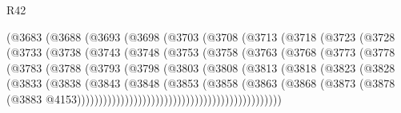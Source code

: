 \begin{lexlean}{R42}
\begin{coremodule}
{                (@3683
                  (@3688
                    (@3693
                      (@3698
                        (@3703
                          (@3708
                            (@3713
                              (@3718
                                (@3723
                                  (@3728
                                    (@3733
                                      (@3738
                                        (@3743
                                          (@3748
                                            (@3753
                                              (@3758
                                                (@3763
                                                  (@3768
                                                    (@3773
                                                      (@3778
                                                        (@3783
                                                          (@3788
                                                            (@3793
                                                              (@3798
                                                                (@3803
                                                                  (@3808
                                                                    (@3813
                                                                      (@3818
                                                                        (@3823
                                                                          (@3828
                                                                            (@3833
                                                                              (@3838
                                                                                (@3843
                                                                                  (@3848
                                                                                    (@3853
                                                                                      (@3858
                                                                                        (@3863
                                                                                          (@3868
                                                                                            (@3873
                                                                                              (@3878
                                                                                                (@3883
                                                                                                  @4153)))))))))))))))))))))))))))))))))))))))))))))))
}
\end{coremodule}
\end{lexlean}
